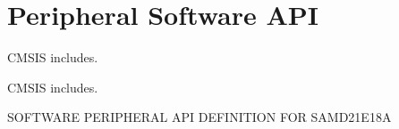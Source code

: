 \hypertarget{group___s_a_m_d21_e18_a__api}{}\section{Peripheral Software A\+PI}
\label{group___s_a_m_d21_e18_a__api}


C\+M\+S\+IS includes.  


C\+M\+S\+IS includes. 

S\+O\+F\+T\+W\+A\+RE P\+E\+R\+I\+P\+H\+E\+R\+AL A\+PI D\+E\+F\+I\+N\+I\+T\+I\+ON F\+OR S\+A\+M\+D21\+E18A 